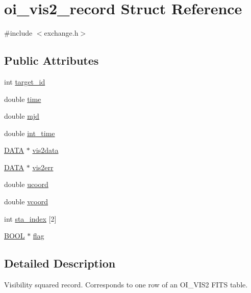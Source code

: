 \hypertarget{structoi__vis2__record}{
\section{oi\_\-vis2\_\-record Struct Reference}
\label{structoi__vis2__record}
}


{\ttfamily \#include $<$exchange.h$>$}

\subsection*{Public Attributes}
\begin{DoxyCompactItemize}
\item 
int \hyperlink{structoi__vis2__record_abf5987df87382c49cbcd70d74917fec2}{target\_\-id}
\item 
double \hyperlink{structoi__vis2__record_a5e0064a4bcc55dfd0d91e8a1d9fd06b7}{time}
\item 
double \hyperlink{structoi__vis2__record_ae92d1c7889d59a87cea5a630c5c25ca7}{mjd}
\item 
double \hyperlink{structoi__vis2__record_a897500d0a2d8d7872db27f5d3f3699cd}{int\_\-time}
\item 
\hyperlink{group__oitable_gaad99e8bad1a589e9f406f33403d42ca7}{DATA} $\ast$ \hyperlink{structoi__vis2__record_a5ede0f7f9e235950bb7c7f2b03cd8209}{vis2data}
\item 
\hyperlink{group__oitable_gaad99e8bad1a589e9f406f33403d42ca7}{DATA} $\ast$ \hyperlink{structoi__vis2__record_a6403351f110c9d2be5c6b0b2270c4c78}{vis2err}
\item 
double \hyperlink{structoi__vis2__record_a4d7b00239c50fe8e82a84ffa30cb0e3d}{ucoord}
\item 
double \hyperlink{structoi__vis2__record_a24770a77f022907a90bd20f58ca0dd50}{vcoord}
\item 
int \hyperlink{structoi__vis2__record_acd326aca20e90619e65415d15311a51c}{sta\_\-index} \mbox{[}2\mbox{]}
\item 
\hyperlink{group__oitable_gaf492d2bddcb2befacb3aa03dcdf9aafd}{BOOL} $\ast$ \hyperlink{structoi__vis2__record_adff8b3553966c55ab1e7e7f8ca6a984d}{flag}
\end{DoxyCompactItemize}


\subsection{Detailed Description}
Visibility squared record. Corresponds to one row of an OI\_\-VIS2 FITS table. 

